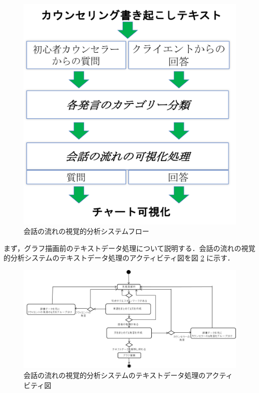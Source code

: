 \documentclass[shuuron]{kuee}
\begin{document}
\begin{figure}
  \begin{center}
    \includegraphics[width=\linewidth]{4_2.png}
  \end{center}
  \caption{会話の流れの視覚的分析システムフロー}
  \label{fig:4_2}
\end{figure}



まず，グラフ描画前のテキストデータ処理について説明する．会話の流れの視覚的分析システムのテキストデータ処理のアクティビティ図を図
\ref{fig:activity}
に示す．%
\begin{figure}
  \begin{center}
    \includegraphics[width=\linewidth]{activity.png}
  \end{center}
  \caption{会話の流れの視覚的分析システムのテキストデータ処理のアクティビティ図}
  \label{fig:activity}
\end{figure}
\end{document}
